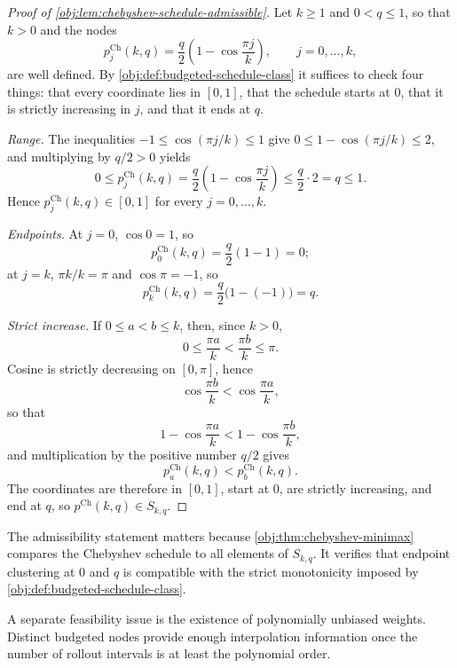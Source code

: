 \documentclass[11pt]{article}
\begin{document}
\begin{proof}[Proof of \cref{obj:lem:chebyshev-schedule-admissible}]
Let \(k\ge1\) and \(0<q\le1\), so that \(k>0\) and the nodes
\[
p^{\mathrm{Ch}}_j(k,q)=\frac q2\left(1-\cos\frac{\pi j}{k}\right),
\qquad j=0,\ldots,k,
\]
are well defined. By \cref{obj:def:budgeted-schedule-class} it suffices to check four things: that every coordinate lies in \([0,1]\), that the schedule starts at \(0\), that it is strictly increasing in \(j\), and that it ends at \(q\).

\emph{Range.}
The inequalities \(-1\le \cos(\pi j/k)\le1\) give \(0\le 1-\cos(\pi j/k)\le2\), and multiplying by \(q/2>0\) yields
\[
0
\le
p^{\mathrm{Ch}}_j(k,q)
=
\frac q2\left(1-\cos\frac{\pi j}{k}\right)
\le
\frac q2\cdot 2
=
q
\le
1 .
\]
Hence \(p^{\mathrm{Ch}}_j(k,q)\in[0,1]\) for every \(j=0,\ldots,k\). %

\emph{Endpoints.}
At \(j=0\), \(\cos 0=1\), so
\[
p^{\mathrm{Ch}}_0(k,q)=\frac q2(1-1)=0 ;
\]
at \(j=k\), \(\pi k/k=\pi\) and \(\cos\pi=-1\), so
\[
p^{\mathrm{Ch}}_k(k,q)=\frac q2\bigl(1-(-1)\bigr)=q .
\] %

\emph{Strict increase.}
If \(0\le a<b\le k\), then, since \(k>0\),
\[
0\le \frac{\pi a}{k}<\frac{\pi b}{k}\le \pi .
\]
Cosine is strictly decreasing on \([0,\pi]\), hence
\[
\cos\frac{\pi b}{k}<\cos\frac{\pi a}{k},
\]
so that
\[
1-\cos\frac{\pi a}{k}
<
1-\cos\frac{\pi b}{k},
\]
and multiplication by the positive number \(q/2\) gives
\[
p^{\mathrm{Ch}}_a(k,q)<p^{\mathrm{Ch}}_b(k,q).
\] %
The coordinates are therefore in \([0,1]\), start at \(0\), are strictly increasing, and end at \(q\), so \(p^{\mathrm{Ch}}(k,q)\in S_{k,q}\). %
\end{proof}

The admissibility statement matters because \cref{obj:thm:chebyshev-minimax} compares the Chebyshev schedule to all elements of \(S_{k,q}\). It verifies that endpoint clustering at \(0\) and \(q\) is compatible with the strict monotonicity imposed by \cref{obj:def:budgeted-schedule-class}.

A separate feasibility issue is the existence of polynomially unbiased weights. Distinct budgeted nodes provide enough interpolation information once the number of rollout intervals is at least the polynomial order.
\end{document}
